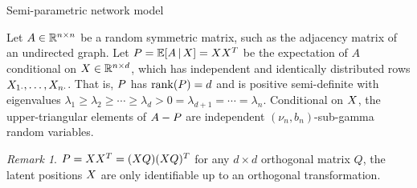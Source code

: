 \documentclass[aspectratio=169]{beamer}
\theoremstyle{remark}
\newtheorem*{remark}{Remark}
\begin{document}






\begin{frame}{Semi-parametric network model}

    \begin{definition}
        Let $A \in \mathbb{R}^{n \times n}$ be a random symmetric matrix, such as the adjacency matrix of an undirected graph. Let $\Apop = \E[\X]{A} = \X \X^T$ be the expectation of $A$ conditional on $X \in \mathbb{R}^{n \times d}$, which has independent and identically distributed rows $X_{1 \cdot}, \dots, X_{n \cdot}$. That is, $P$ has $\rank \paren*{\Apop} = d$ and is positive semi-definite with eigenvalues $\lambda_1 \ge \lambda_2 \ge \cdots \ge \lambda_d > 0 = \lambda_{d+1} = \cdots = \lambda_n$. Conditional on $X$, the upper-triangular elements of $A - P$ are independent $(\nu_n, b_n)$-sub-gamma random variables.
    \end{definition}

    \begin{remark}
        $P = X X^T = (X Q) (X Q)^T$ for any $d \times d$ orthogonal matrix $Q$, the latent positions $X$ are only identifiable up to an orthogonal transformation.
    \end{remark}

\end{frame}
\end{document}
